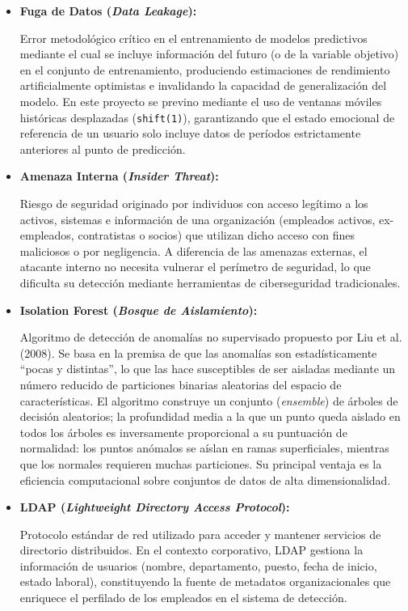 \documentclass[IB]{TFUOC}%
\begin{document}
\begin{itemize}
    \item \textbf{Fuga de Datos (\textit{Data Leakage}):}
    
    Error metodológico crítico en el entrenamiento de modelos predictivos mediante el cual se incluye información del futuro (o de la variable objetivo) en el conjunto de entrenamiento, produciendo estimaciones de rendimiento artificialmente optimistas e invalidando la capacidad de generalización del modelo. En este proyecto se previno mediante el uso de ventanas móviles históricas desplazadas (\texttt{shift(1)}), garantizando que el estado emocional de referencia de un usuario solo incluye datos de períodos estrictamente anteriores al punto de predicción.

    \item \textbf{Amenaza Interna (\textit{Insider Threat}):}
    
    Riesgo de seguridad originado por individuos con acceso legítimo a los activos, sistemas e información de una organización (empleados activos, ex-empleados, contratistas o socios) que utilizan dicho acceso con fines maliciosos o por negligencia. A diferencia de las amenazas externas, el atacante interno no necesita vulnerar el perímetro de seguridad, lo que dificulta su detección mediante herramientas de ciberseguridad tradicionales.

    \item \textbf{Isolation Forest (\textit{Bosque de Aislamiento}):}
    
    Algoritmo de detección de anomalías no supervisado propuesto por Liu et al. (2008). Se basa en la premisa de que las anomalías son estadísticamente ``pocas y distintas'', lo que las hace susceptibles de ser aisladas mediante un número reducido de particiones binarias aleatorias del espacio de características. El algoritmo construye un conjunto (\textit{ensemble}) de árboles de decisión aleatorios; la profundidad media a la que un punto queda aislado en todos los árboles es inversamente proporcional a su puntuación de normalidad: los puntos anómalos se aíslan en ramas superficiales, mientras que los normales requieren muchas particiones. Su principal ventaja es la eficiencia computacional sobre conjuntos de datos de alta dimensionalidad.

    \item \textbf{LDAP (\textit{Lightweight Directory Access Protocol}):}
    
    Protocolo estándar de red utilizado para acceder y mantener servicios de directorio distribuidos. En el contexto corporativo, LDAP gestiona la información de usuarios (nombre, departamento, puesto, fecha de inicio, estado laboral), constituyendo la fuente de metadatos organizacionales que enriquece el perfilado de los empleados en el sistema de detección.


\end{itemize}
\end{document}
